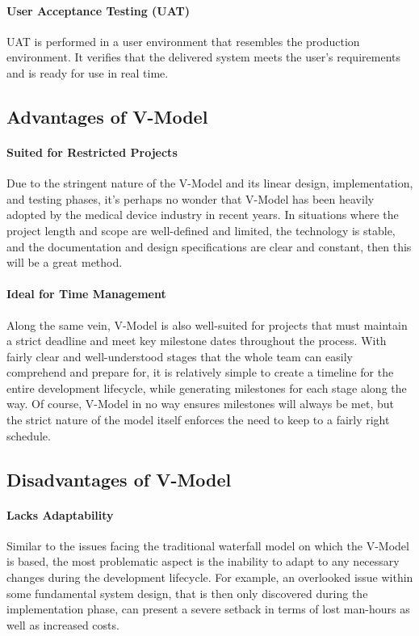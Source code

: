 \documentclass[main.tex]{subfiles}
\begin{document}
\paragraph{User Acceptance Testing (UAT)}
UAT is performed in a user environment that resembles the production environment. It verifies that the delivered system meets the user’s requirements and is ready for use in real time.

\subsection{Advantages of V-Model}

\paragraph{Suited for Restricted Projects}
Due to the stringent nature of the V-Model and its linear design, implementation, and testing phases, it's perhaps no wonder that V-Model has been heavily adopted by the medical device industry in recent years.
In situations where the project length and scope are well-defined and limited, the technology is stable, and the documentation and design specifications are clear and constant, then this will be a great method.

\paragraph{Ideal for Time Management}
Along the same vein, V-Model is also well-suited for projects that must maintain a strict deadline and meet key milestone dates throughout the process.
With fairly clear and well-understood stages that the whole team can easily comprehend and prepare for, it is relatively simple to create a timeline for the entire development lifecycle, while generating milestones for each stage along the way. Of course, V-Model in no way ensures milestones will always be met, but the strict nature of the model itself enforces the need to keep to a fairly right schedule.

\subsection{Disadvantages of V-Model}

\paragraph{Lacks Adaptability}
Similar to the issues facing the traditional waterfall model on which the V-Model is based, the most problematic aspect is the inability to adapt to any necessary changes during the development lifecycle.
For example, an overlooked issue within some fundamental system design, that is then only discovered during the implementation phase, can present a severe setback in terms of lost man-hours as well as increased costs.
\end{document}
